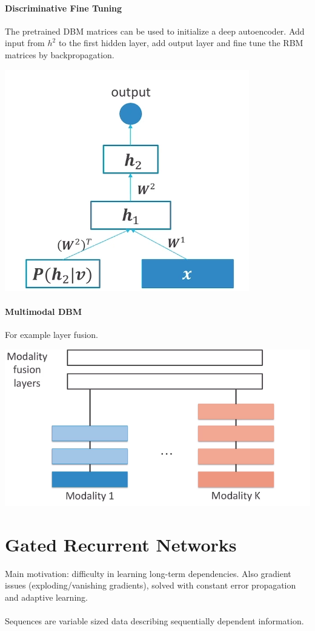 \documentclass[10pt]{report}
\begin{document}
\paragraph{Discriminative Fine Tuning}
The pretrained DBM matrices can be used to initialize a deep autoencoder. Add input from $h^2$ to the first hidden layer, add output layer and fine tune the RBM matrices by backpropagation.\begin{center}
	\includegraphics[scale=0.5]{84.png}
\end{center}
\paragraph{Multimodal DBM} For example layer fusion.
\begin{center}
	\includegraphics[scale=0.5]{85.png}
\end{center}
\section{Gated Recurrent Networks}
Main motivation: difficulty in learning long-term dependencies. Also gradient issues (exploding/vanishing gradients), solved with constant error propagation and adaptive learning.\\\\
Sequences are variable sized data describing sequentially dependent information.
\end{document}
